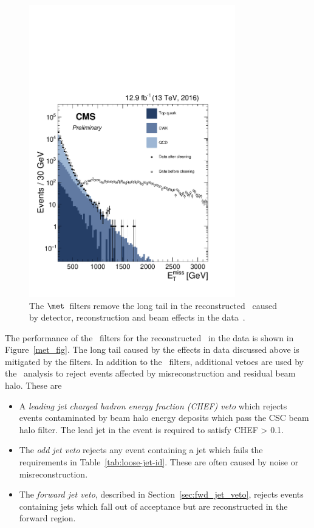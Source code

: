 \begin{figure}
\centering
    \includegraphics[width=0.8\textwidth]{./Figures/alphat/met_clean}
  \caption{\label{fig:met_filter} The $\met$~filters remove the long tail in the reconstructed \met~caused by detector, reconstruction
  and beam effects in the data~\cite{met_fig}.} 
\end{figure}
The performance of the \met~filters for the reconstructed \met~in the data is shown in Figure~\ref{met_fig}. The long tail caused by
the effects in data discussed above is mitigated by the filters. In addition to the \met~filters, 
additional vetoes are used by the \alphat~analysis to reject events affected by misreconstruction and residual beam halo. These are
\begin{itemize}
\item A \emph{leading jet charged hadron energy fraction (CHEF) veto} which rejects events 
contaminated by beam halo energy deposits which pass the CSC beam halo filter. The lead jet 
in the event is required to satisfy CHEF > 0.1.
\item The \emph{odd jet veto} rejects any event containing a jet which fails the 
requirements in Table~\ref{tab:loose-jet-id}. These are often caused by noise or misreconstruction.
\item The \emph{forward jet veto}, described in Section~\ref{sec:fwd_jet_veto}, rejects events containing jets which fall out of acceptance but
are reconstructed in the forward region. 
\end{itemize}

